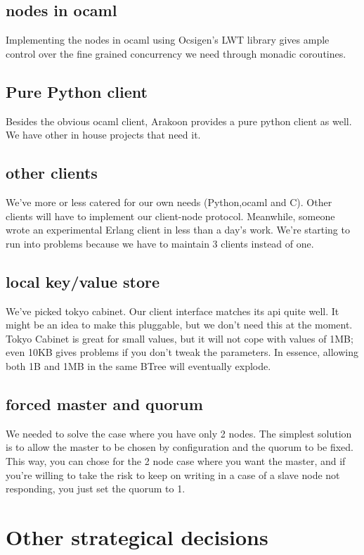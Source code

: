 \subsection{nodes in ocaml}
Implementing the nodes in ocaml using Ocsigen's LWT library gives ample control over the fine grained concurrency we need through monadic coroutines.
\subsection{Pure Python client}
Besides the obvious ocaml client, Arakoon provides a pure python client as well. We have other in house projects that need it.

\subsection{other clients}
We've more or less catered for our own needs (Python,ocaml and C).
Other clients will have to implement our client-node protocol. 
Meanwhile, someone wrote an experimental Erlang client in less than a day's work. We're starting to run into problems because we have to maintain 3 clients instead of one.

\subsection{local key/value store}
We've picked tokyo cabinet. 
Our client interface matches its api quite well. 
It might be an idea to make this pluggable, but we don't need this at the moment.
Tokyo Cabinet is great for small values, but it will not cope with values of 1MB; 
even 10KB gives problems if you don't tweak the parameters. 
In essence, allowing both 1B and 1MB in the same BTree will eventually explode.

\subsection{forced master and quorum}
We needed to solve the case where you have only 2 nodes.
The simplest solution is to allow the master to be chosen by configuration and the quorum to be fixed. 
This way, you can chose for the 2 node case where you want the master, 
and if you're willing to take the risk to keep on writing in a case of a slave node not responding, you just set the quorum to 1.

\section{Other strategical decisions}
